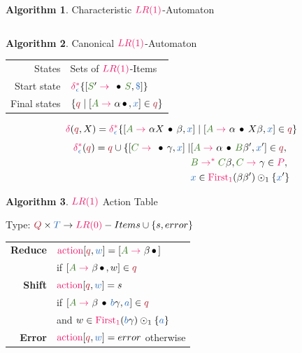 \documentclass[10pt, landscape]{article}
\theoremstyle{definition}
\newtheorem{algorithm}{Algorithm}[section]
\newcommand{\Op}[1]{\textcolor{WildStrawberry}{#1}}
\newcommand{\OneConcat}{\odot_{1}}
\newcommand{\Bul}{\,\bullet\,}
\newcommand{\derive}[1][]{\Op{\;\rightarrow_{#1}\;}}
\newcommand{\derives}[1][]{\Op{\;\rightarrow_{#1}^{*}\;}}
\newcommand{\nontermcolor}{OliveGreen}
\newcommand{\nt}[1]{\textcolor{\nontermcolor}{#1}}
\newcommand{\ntA}{\nt{A}}
\newcommand{\ntB}{\nt{B}}
\newcommand{\ntC}{\nt{C}}
\newcommand{\ntS}{\nt{S}}
\newcommand{\termcolor}{NavyBlue}
\newcommand{\terms}{\textcolor{\termcolor}{T}}
\newcommand{\termW}{\textcolor{\termcolor}{w}}
\newcommand{\termA}{\textcolor{\termcolor}{a}}
\newcommand{\termB}{\textcolor{\termcolor}{b}}
\newcommand{\termX}{\textcolor{\termcolor}{x}}
\newcommand{\termEnd}{\textcolor{\termcolor}{\$}}
\newcommand{\prodcolor}{WildStrawberry}
\newcommand{\prods}{\textcolor{\prodcolor}{P}}
\newcommand{\LRZero}{\textcolor{\prodcolor}{LR (0)}}
\newcommand{\LROne}{\textcolor{\prodcolor}{LR (1)}}
\newcommand{\FirstOne}{\textcolor{\prodcolor}{\text{First}_{1}}}
\newcommand{\trans}{%
  { \textcolor{WildStrawberry}{\delta} }
}
\newcommand{\closedtrans}{%
  \textcolor{WildStrawberry}{\delta}_{ \textcolor{NavyBlue}{\epsilon} }^{ \textcolor{WildStrawberry}{*} }
}
\newcommand{\statecolor}{Maroon}
\newcommand{\states}{\textcolor{\statecolor}{Q}}
\newcommand{\stateQ}[1][]{\textcolor{\statecolor}{q_{#1}}}
\newcommand{\Action}{\textcolor{WildStrawberry}{\text{action}}}
\begin{document}
\begin{multicols*}{3}
\begin{algorithm}{Characteristic $\LROne$-Automaton}
\begin{tabular}{r l}
  \end{tabular}

\end{algorithm}

\begin{algorithm}{Canonical $\LROne$-Automaton}

  \begin{tabular}{r l}

    States       & Sets of $\LROne$-Items \\
    Start state  & $\closedtrans \{ [\ntS' \derive \Bul \ntS, \termEnd] \}$ \\
    Final states & $\{ \stateQ \mid [\ntA \derive \alpha \Bul, \termX] \in \stateQ \}$
  \end{tabular}

  \[
    \trans(\stateQ, X) = \closedtrans \{ [\ntA \derive \alpha X \Bul \beta, \termX] \mid [\ntA \derive \alpha \Bul X \beta, \termX] \in \stateQ \}
  \]
  \[
    \begin{aligned}
      \closedtrans (\stateQ) = \stateQ \cup \{ [\ntC \derive \Bul \gamma, \termX] \mid & [\ntA \derive \alpha
                                                                                         \Bul \ntB \beta', \termX']
                                                                                         \in \stateQ, \\
                                                                                       & \ntB \derives \ntC \beta, \ntC \derive \gamma \in \prods, \\
                                                                                       & \termX \in \FirstOne (\beta\beta')\OneConcat \{ \termX' \}
    \end{aligned}
  \]

\end{algorithm}

\begin{algorithm}{$\LROne$ Action Table}

  Type: $\states \times \terms \rightarrow \LRZero-Items \cup \{s, error\}$

  \begin{tabular}{r l}
    \textbf{Reduce} & $\Action[\stateQ, \termW] = [\ntA \derive \beta \Bul]$ \\
                    & \indent if $[\ntA \derive \beta \Bul, w] \in \stateQ$ \\
    \textbf{Shift}  & $\Action[\stateQ, \termW] = s$ \\
                    & \indent if $[\ntA \derive \beta \Bul \termB \gamma, \termA] \in \stateQ$ \\
                    & \indent and $w \in \FirstOne (\termB \gamma) \OneConcat \{ \termA \}$ \\
    \textbf{Error}  & $\Action[\stateQ, \termW] = error$ otherwise
  \end{tabular}


\end{algorithm}
\end{multicols*}
\end{document}
